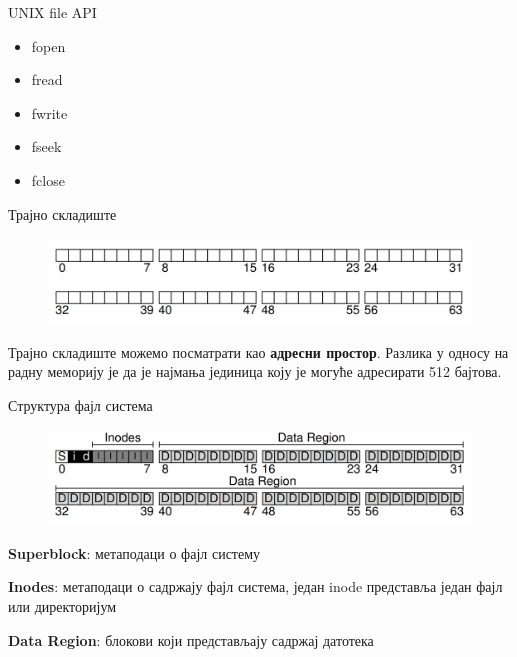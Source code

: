 \documentclass[xcolor=table]{beamer}
\begin{document}
    \begin{frame}{UNIX file API}
        \begin{itemize}
            \item fopen
            \item fread
            \item fwrite
            \item fseek
            \item fclose
        \end{itemize}
    \end{frame}
    
    \begin{frame}{Трајно складиште}
        \begin{figure}
            \includegraphics[width=\textwidth,height=0.8\textheight,keepaspectratio]{images/hdd_address_space.png}
            \label{fig:hdd_address_space.png}
        \end{figure}
        
        Трајно складиште можемо посматрати као \textbf{адресни простор}. Разлика у односу на радну меморију је да је најмања јединица коју
        је могуће адресирати 512 бајтова.
    \end{frame}
    
    \begin{frame}{Структура фајл система}
        \begin{figure}
            \includegraphics[width=\textwidth,height=0.8\textheight,keepaspectratio]{images/fs_structure.png}
            \label{fig:fs_structure.png}
        \end{figure}
        
        \textbf{Superblock}: метаподаци о фајл систему
        
        \textbf{Inodes}: метаподаци о садржају фајл система, један inode представља један фајл или директоријум
        
        \textbf{Data Region}: блокови који представљају садржај датотека
    \end{frame}
    
\end{document}
